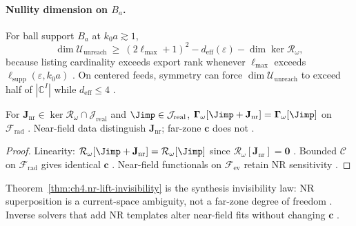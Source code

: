 \paragraph{Nullity dimension on \(B_{a}\).}
For ball support \(B_{a}\) at \(k_{0}a\gtrsim1\),
\begin{equation}
\label{eq:ch4.unreach-dim-bound}
\dim\mathcal{U}_{\mathrm{unreach}}\ \ge\ (2\ell_{\max}+1)^{2}-d_{\mathrm{eff}}(\varepsilon)-\dim\ker\mathcal{R}_\omega,
\end{equation}
because listing cardinality exceeds export rank whenever \(\ell_{\max}\) exceeds \(\ell_{\mathrm{supp}}(\varepsilon,k_{0}a)\)
\cite{hansen1988,harrington2001,stratton1941}. On centered feeds, symmetry can force \(\dim\mathcal{U}_{\mathrm{unreach}}\) to exceed half of
\(|\mathbb{C}^{I}|\) while \(d_{\mathrm{eff}}\le4\) \cite{jackson1999,hansen1988}.

\begin{theorem}
\label{thm:ch4.nr-lift-invisibility}
For \(\mathbf{J}_{\mathrm{nr}}\in\ker\mathcal{R}_\omega\cap\mathcal{J}_{\mathrm{real}}\) and \(\Jimp\in\mathcal{J}_{\mathrm{real}}\),
\(\boldsymbol{\Gamma}_\omega[\Jimp+\mathbf{J}_{\mathrm{nr}}]=\boldsymbol{\Gamma}_\omega[\Jimp]\) on \(\mathcal{F}_{\mathrm{rad}}\)
\cite{stratton1941,harrington2001}. Near-field data distinguish \(\mathbf{J}_{\mathrm{nr}}\); far-zone \(\mathbf{c}\) does not \cite{devaney2004}.
\end{theorem}
\begin{proof}
Linearity: \(\mathcal{R}_\omega[\Jimp+\mathbf{J}_{\mathrm{nr}}]=\mathcal{R}_\omega[\Jimp]\) since \(\mathcal{R}_\omega[\mathbf{J}_{\mathrm{nr}}]=\mathbf{0}\)
\cite{stratton1941}. Bounded \(\mathcal{C}\) on \(\mathcal{F}_{\mathrm{rad}}\) gives identical \(\mathbf{c}\) \cite{hansen1988,harrington2001}. Near-field
functionals on \(\mathcal{F}_{\mathrm{ev}}\) retain NR sensitivity \cite{devaney2004}.
\end{proof}

Theorem~\ref{thm:ch4.nr-lift-invisibility} is the synthesis invisibility law: NR superposition is a current-space ambiguity, not a far-zone degree of
freedom \cite{stratton1941,harrington2001}. Inverse solvers that add NR templates alter near-field fits without changing \(\mathbf{c}\)
\cite{devaney2004,hansen1988}.

